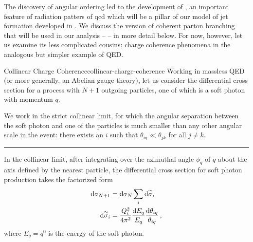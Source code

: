 The discovery of angular ordering led to the development of  \cite{Dokshitzer:1982fh,Webber:1983if,Marchesini:1983bm,Ciafaloni:1984zr,Ellis:1996mzs,Collins:2011zzd}, an important feature of radiation patters of \gls{qcd} which will be a pillar of our model of jet formation developed in .
%
We discuss the version of coherent parton branching that will be used in our analysis --  -- in more detail below.
%
For now, however, let us examine its less complicated cousins:
%
charge coherence phenomena in the analogous but simpler example of QED.

\begin{lemma}{Collinear Charge Coherence}{collinear-charge-coherence}
    Working in massless QED (or more generally, an Abelian gauge theory), let us consider the differential cross section for a process with \(N+1\) outgoing particles, one of which is a soft photon with momentum \(q\).

    We work in the strict collinear limit, for which the angular separation between the soft photon and one of the particles is much smaller than any other angular scale in the event:
    there exists an \(i\) such that \(\theta_{iq} \ll \theta_{jk}\) for all \(j \neq k\).

    \vspace{7pt}
    \hrule
    \vspace{7pt}

    In the collinear limit, after integrating over the azimuthal angle \(\phi_{q}\) of \(q\) about the axis defined by the nearest particle, the differential cross section for soft photon production takes the factorized form
    \begin{align}
        \label{eq:soft-photon-factorization}
        \dd \sigma_{N+1}
        &=
        \dd\sigma_N
        \sum_i\dsigmatilde_i
        \\
        \label{eq:soft-photon-splitting-probability}
        \dsigmatilde_i
        &=
        \frac{Q_i^2}{4\pi^2}
        \frac{\dd E_q}{E_q}
        \frac{\dd\theta_{iq}}{\theta_{iq}}
        \,,
    \end{align}
    where \(E_q = q^0\) is the energy of the soft photon.
\end{lemma}


